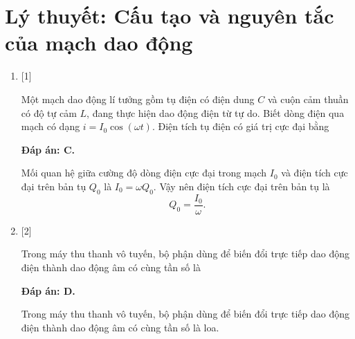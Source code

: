 \whiteBGstarBegin
\setcounter{section}{0}

\section{Lý thuyết: Cấu tạo và nguyên tắc của mạch dao động}
\begin{enumerate}[label=\bfseries Câu \arabic*:]
	\item {} [1] %
	
	\cauhoi
	{Một mạch dao động lí tưởng gồm tụ điện có điện dung $C$ và cuộn cảm thuần có độ tự cảm $L$, đang thực hiện dao động điện từ tự do. Biết dòng điện qua mạch có dạng $i = I_0 \cos \left( \omega t \right)$. Điện tích tụ điện có giá trị cực đại bằng
	}
	
	\loigiai
	{		\textbf{Đáp án: C.}
		
		Mối quan hệ giữa cường độ dòng điện cực đại trong mạch $I_0$ và điện tích cực đại trên bản tụ $Q_0$ là $I_0 = \omega Q_0$. Vậy nên điện tích cực đại trên bản tụ là 
		$$Q_0 = \dfrac{I_0}{\omega}.$$
		
	}

	\item {} [2] %
	
	\cauhoi
	{Trong máy thu thanh vô tuyến, bộ phận dùng để biến đổi trực tiếp dao động điện thành dao động âm có cùng tần số là
	}
	
	\loigiai
	{		\textbf{Đáp án: D.}
		
		Trong máy thu thanh vô tuyến, bộ phận dùng để biến đổi trực tiếp dao động điện thành dao động âm có cùng tần số là loa.
		
}
\end{enumerate}
